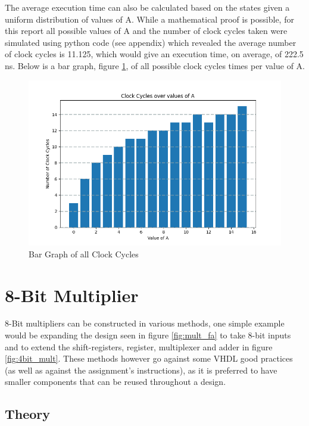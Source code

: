 \documentclass[11pt]{article}
\begin{document}
The average execution time can also be calculated based on the states given a uniform distribution of values of A. 
While a mathematical proof is possible, for this report all possible values of A and the number of clock cycles taken were simulated using python code (see appendix)
which revealed the average number of clock cycles is 11.125, which would give an execution time, on average, of 222.5 ns.
Below is a bar graph, figure \ref{fig:bar}, of all possible clock cycles times per value of A.

\begin{figure}[H]        
    \centering
    \includegraphics[width=\textwidth]{ClockCycles.png}
    \caption{Bar Graph of all Clock Cycles}
    \label{fig:bar}
\end{figure} 

\section{8-Bit Multiplier}

8-Bit multipliers can be constructed in various methods, one simple example would be expanding the design seen in figure \ref{fig:mult_fa} to take 8-bit inputs and to extend the shift-registers, register, multiplexer and adder in figure \ref{fig:4bit_mult}.
These methods however go against some VHDL good practices (as well as against the assignment's instructions),
as it is preferred to have smaller components that can be reused throughout a design.

\subsection{Theory}
\end{document}
